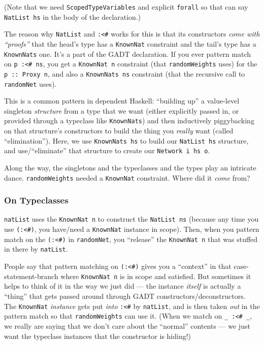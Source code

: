 \documentclass[]{article}
\begin{document}
(Note that we need \texttt{ScopedTypeVariables} and explicit
\texttt{forall} so that can say \texttt{NatList\ hs} in the body of the
declaration.)

The reason why \texttt{NatList} and \texttt{:\textless{}\#} works for
this is that its constructors \emph{come with ``proofs''} that the
head's type has a \texttt{KnownNat} constraint and the tail's type has a
\texttt{KnownNats} one. It's a part of the GADT declaration. If you ever
pattern match on \texttt{p\ :\textless{}\#\ ns}, you get a
\texttt{KnownNat\ n} constraint (that \texttt{randomWeights} uses) for
the \texttt{p\ ::\ Proxy\ n}, and also a \texttt{KnownNats\ ns}
constraint (that the recursive call to \texttt{randomNet} uses).

This is a common pattern in dependent Haskell: ``building up'' a
value-level singleton \emph{structure} from a type that we want (either
explicitly passed in, or provided through a typeclass like
\texttt{KnownNats}) and then inductively piggybacking on that
structure's constructors to build the thing you \emph{really} want
(called ``elimination''). Here, we use \texttt{KnownNats\ hs} to build
our \texttt{NatList\ hs} structure, and use/``eliminate'' that structure
to create our \texttt{Network\ i\ hs\ o}.

Along the way, the singletons and the typeclasses and the types play an
intricate dance. \texttt{randomWeights} needed a \texttt{KnownNat}
constraint. Where did it \emph{come} from?

\subsubsection{On Typeclasses}\label{on-typeclasses}

\texttt{natList} uses the \texttt{KnownNat\ n} to construct the
\texttt{NatList\ ns} (because any time you use
\texttt{(:\textless{}\#)}, you have/need a \texttt{KnownNat} instance in
scope). Then, when you pattern match on the \texttt{(:\textless{}\#)} in
\texttt{randomNet}, you ``release'' the \texttt{KnownNat\ n} that was
stuffed in there by \texttt{natList}.

People say that pattern matching on \texttt{(:\textless{}\#)} gives you
a ``context'' in that case-statement-branch where \texttt{KnownNat\ n}
is in scope and satisfied. But sometimes it helps to think of it in the
way we just did --- the instance \emph{itself} is actually a ``thing''
that gets passed around through GADT constructors/deconstructors. The
\texttt{KnownNat} \emph{instance} gets put \emph{into}
\texttt{:\textless{}\#} by \texttt{natList}, and is then taken
\emph{out} in the pattern match so that \texttt{randomWeights} can use
it. (When we match on \texttt{\_\ :\textless{}\#\ \_}, we really are
saying that we don't care about the ``normal'' contents --- we just want
the typeclass instances that the constructor is hiding!)
\end{document}
